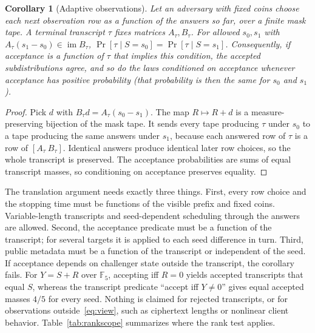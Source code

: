 \documentclass[pdflatex,sn-mathphys-num,twocolumn]{sn-jnl}
\theoremstyle{plain}
\newtheorem{corollary}[theorem]{Corollary}
\theoremstyle{definition}
\newcommand{\F}{\mathbb{F}}
\newcommand{\im}{\operatorname{im}}
\begin{document}
\begin{corollary}[Adaptive observations]\label{cor:adaptive}
Let an adversary with fixed coins choose each next observation row as a function of the answers so far, over a finite mask tape. A terminal transcript $\tau$ fixes matrices $A_\tau,B_\tau$. For allowed $s_0,s_1$ with $A_\tau(s_1-s_0)\in\im B_\tau$, $\Pr[\tau\mid S=s_0]=\Pr[\tau\mid S=s_1]$. Consequently, if acceptance is a function of $\tau$ that implies this condition, the accepted subdistributions agree, and so do the laws conditioned on acceptance whenever acceptance has positive probability (that probability is then the same for $s_0$ and $s_1$).
\end{corollary}
\begin{proof}
Pick $d$ with $B_\tau d=A_\tau(s_0-s_1)$. The map $R\mapsto R+d$ is a measure-preserving bijection of the mask tape. It sends every tape producing $\tau$ under $s_0$ to a tape producing the same answers under $s_1$, because each answered row of $\tau$ is a row of $[A_\tau\ B_\tau]$. Identical answers produce identical later row choices, so the whole transcript is preserved. The acceptance probabilities are sums of equal transcript masses, so conditioning on acceptance preserves equality.
\end{proof}

The translation argument needs exactly three things. First, every row choice and the stopping time must be functions of the visible prefix and fixed coins. Variable-length transcripts and seed-dependent scheduling through the answers are allowed. Second, the acceptance predicate must be a function of the transcript; for several targets it is applied to each seed difference in turn. Third, public metadata must be a function of the transcript or independent of the seed. If acceptance depends on challenger state outside the transcript, the corollary fails. For $Y=S+R$ over $\F_5$, accepting iff $R=0$ yields accepted transcripts that equal $S$, whereas the transcript predicate ``accept iff $Y\neq0$'' gives equal accepted masses $4/5$ for every seed. Nothing is claimed for rejected transcripts, or for observations outside~\eqref{eq:view}, such as ciphertext lengths or nonlinear client behavior. Table~\ref{tab:rankscope} summarizes where the rank test applies.
\end{document}
